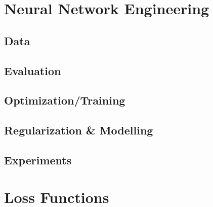 \documentclass{article}
\begin{document}
\begin{definition}
    
\end{definition}

\begin{example}
    
\end{example}
\newpage

\section{Neural Network Engineering}
\subsection{Data}
\begin{summary}
    
\end{summary}

\subsection{Evaluation}

\subsection{Optimization/Training}

\subsection{Regularization \& Modelling}

\subsection{Experiments}


\section{Loss Functions}
\begin{summary}
\end{summary}
\end{document}
